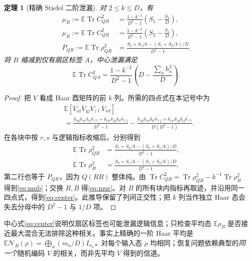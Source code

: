 \documentclass[UTF8,a4paper,11pt]{ctexart}
\newtheorem{theorem}{定理}
\DeclareMathOperator{\Tr}{Tr}
\newcommand{\EE}{\mathbb E}
\begin{document}
\begin{theorem}[精确 Stiefel 二阶泄漏]\label{thm:moments}
对 $2\leq k\leq D$，有
\begin{align}
 \boxed{\mu_B:=\EE\Tr C_{QB}^2}
 &=\frac{1-k^{-2}}{D^2-1}\left(S_1-\frac{S_2}{D}\right),\label{eq:mub}\\
 \mu_R:=\EE\Tr C_{QR}^2
 &=\frac{1-k^{-2}}{D^2-1}\left(S_2-\frac{S_1}{D}\right),\label{eq:mur}\\
 P_{QR}:=\EE\Tr\rho_{QR}^2
 &=\frac{S_2+S_1/k-(S_1+S_2/k)/D}{D^2-1}.\label{eq:pqr}
\end{align}
将 $B$ 缩减到仅有扇区标签 $A$，中心泄漏满足
\begin{equation}\label{eq:center}
 \EE\Tr C_{QA}^2
 =\frac{1-k^{-2}}{D^2-1}
 \left(D-\frac{\sum_a h_a^2}{D}\right).
\end{equation}
\end{theorem}
\begin{proof}
把 $V$ 看成 Haar 酉矩阵的前 $k$ 列。所需的四点式\cite{CollinsSniady}在本记号中为
\begin{align*}
&\EE[V_{xi}\overline V_{yj}V_{z\ell}\overline V_{wt}]\\
&=\frac{\delta_{xy}\delta_{zw}\delta_{ij}\delta_{\ell t}
 +\delta_{xw}\delta_{zy}\delta_{it}\delta_{\ell j}}{D^2-1}
 -\frac{\delta_{xy}\delta_{zw}\delta_{it}\delta_{\ell j}
 +\delta_{xw}\delta_{zy}\delta_{ij}\delta_{\ell t}}{D(D^2-1)}.
\end{align*}
在各块中按 $r,s$ 与逻辑指标收缩后，分别得到
\begin{align*}
\EE\Tr\rho_{QB}^2
 &=\frac{S_1+S_2/k-(S_2+S_1/k)/D}{D^2-1},\\
\EE\Tr\rho_B^2
 &=\frac{S_2+S_1/k-(S_1+S_2/k)/D}{D^2-1}.
\end{align*}
第二行也等于 $P_{QR}$，因为 $Q(RB)$ 整体纯。由
$\Tr C_{QB}^2=\Tr\rho_{QB}^2-k^{-1}\Tr\rho_B^2$
得到\eqref{eq:mub}；交换 $R,B$ 得\eqref{eq:mur}。对 $B$ 的所有块内指标再取迹，并沿用同一四点式，得到\eqref{eq:center}。此推导保留了列间正交性；把 $k$ 列当作独立 Haar 态会失去分母中的 $D^2-1$ 与 $1/D$ 项。
\end{proof}

中心式\eqref{eq:center}说明仅扇区标签也可能泄漏逻辑信息；只检查平均态 $\EE\rho_B$ 是否接近最大混合无法排除这种相关。事实上精确的一阶 Haar 平均是
$\EE\mathcal N_B(\rho)=\bigoplus_a (m_a/D)I_{n_a}$，对每个输入态 $\rho$ 均相同；恢复问题依赖典型的\emph{同一个}随机编码 $V$ 的相关，而非先平均 $V$ 得到的信道。
\end{document}
